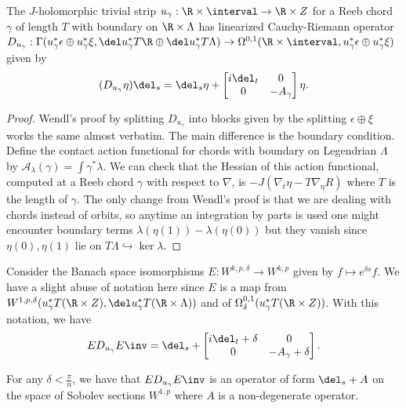\begin{lemma} \label{analog}
The $J$-holomorphic trivial strip $u_\gamma : \R\times \interval \to \R \times Z$ for a Reeb chord $\gamma$ of length $T$ with boundary on $\R \times \Lambda$ has linearized Cauchy-Riemann operator $D_{u_\gamma}:\Gamma(u_\gamma^* \epsilon \oplus u_\gamma^* \xi  , \del u_\gamma^* T\R \oplus \del u_\gamma^* T \Lambda ) \to \Omega^{0,1}(\R \times \interval,u_\gamma^* \epsilon \oplus u_\gamma^* \xi )$ given by   $$(D_{u_\gamma} \eta) \del _s =\del_s \eta + 
\begin{bmatrix} i\del_t  & 0\\0&-A_\gamma \end{bmatrix} \eta.$$

\end{lemma}

\begin{proof}
Wendl's proof by splitting $D_{u_\gamma}$ into blocks given by the splitting $\epsilon \oplus \xi$ works the same  almost verbatim. The main difference is the boundary condition. Define the contact action functional for chords with boundary on  Legendrian $\Lambda$ by $\mathcal{A}_\lambda (\gamma) = \int \gamma^* \lambda $. We can check that the Hessian of this action functional, computed at a Reeb chord $\gamma$ with respect to $\nabla $, is  $-J(\nabla_t \eta - T\nabla_\eta R)$ where $T$ is the length of $\gamma$. The only change from Wendl's proof is that we are dealing with chords instead of orbits, so anytime an integration by parts is used one might encounter boundary terms $\lambda(\eta(1)) - \lambda(\eta(0))$ but they vanish since $\eta(0),\eta(1)$ lie on $ T\Lambda \hookrightarrow \ker \lambda $.
\end{proof}

\noindent Consider the Banach space isomorphisms $E: W^{k,p,\delta} \to W^{k,p}$ given by $f \mapsto e^{\delta s} f$. We have a slight abuse of notation here since $E$ is a map from  $W^{1,p,\delta}(u_\gamma^* T(\R \times Z),\del u_\gamma^* T(\R \times \Lambda))$ and of $\Omega^{0,1}_\delta (u_\gamma ^* T(\R \times Z))$. With this notation, we have 
$$ED_{u_\gamma}E\inv  = \del_s + \begin{bmatrix} i\del_t + \delta  & 0\\0&-A_\gamma + \delta \end{bmatrix}. $$

\begin{lemma} \label{lemma:goodeigen}
For any $   \delta < \frac{\pi}{n}$, we have that $ED_{u_\gamma}E\inv$ is an operator of form $\del_s + A$ on the space of Sobolev sections $W^{1,p}$ where $A$ is a  non-degenerate operator.
\end{lemma}




